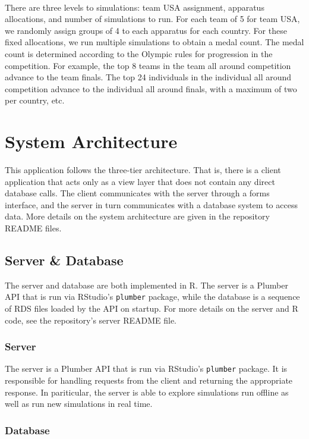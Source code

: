 \documentclass{article}
\begin{document}
\ 

\noindent There are three levels to simulations: team USA assignment, apparatus allocations, and number of simulations to run. 
For each team of 5 for team USA, we randomly assign groups of 4 to each apparatus for each country. For these fixed allocations, 
we run multiple simulations to obtain a medal count. The medal count is determined according to the Olympic rules for progression 
in the competition. For example, the top 8 teams in the team all around competition advance to the team finals. The top 24 
individuals in the individual all around competition advance to the individual all around finals, with a maximum of two per country, etc.

\section{System Architecture}\label{sec:system}
This application follows the three-tier architecture. That is, there is a client
application that acts only as a view layer that does not contain any direct database calls.
The client communicates with the server through a forms interface, and the server
in turn communicates with a database system to access data. More details on 
the system architecture are given in the repository README files.

\subsection{Server \& Database}

The server and database are both implemented in R. The server is a Plumber API that is run via RStudio's \texttt{plumber} package, 
while the database is a sequence of RDS files loaded by the API on startup. For more details on the server and R code,
see the repository's server README file.

\subsubsection{Server}

The server is a Plumber API that is run via RStudio's \texttt{plumber} package. 
It is responsible for handling requests from the client and returning the appropriate 
response. In pariticular, the server is able to explore simulations run offline 
as well as run new simulations in real time.

\subsubsection{Database}
\end{document}
